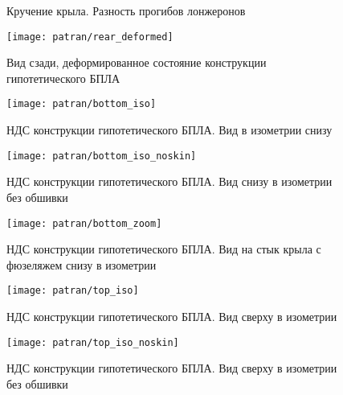 \begin{figure}[H]
\centering
\def\svgwidth{0.9\textwidth}

\caption{Кручение крыла. Разность прогибов лонжеронов}
\label{fig:WingRotating}
\end{figure}


\begin{figure}[H]
\centering
\texttt{[image: patran/rear\_deformed]}
\caption{Вид сзади, деформированное состояние конструкции гипотетического БПЛА}
\label{fig:patranRearDeformed}
\end{figure}


%
%


\begin{figure}[H]
\centering
\texttt{[image: patran/bottom\_iso]}
\caption{НДС конструкции гипотетического БПЛА. Вид в изометрии снизу}
\label{fig:patranBottomIso}
\end{figure}

\begin{figure}[H]
\centering
\texttt{[image: patran/bottom\_iso\_noskin]}
\caption{НДС конструкции гипотетического БПЛА. Вид снизу в изометрии без обшивки}
\label{fig:patranBottomIsoWithoutSkin}
\end{figure}

\begin{figure}[H]
\centering
\texttt{[image: patran/bottom\_zoom]}
\caption{НДС конструкции гипотетического БПЛА. Вид на стык крыла с фюзеляжем снизу в изометрии}
\label{fig:patranBottomIsoZoom}
\end{figure}


\begin{figure}[H]
\centering
\texttt{[image: patran/top\_iso]}
\caption{НДС конструкции гипотетического БПЛА. Вид сверху в изометрии}
\label{fig:patranTopIso}
\end{figure}

\begin{figure}[H]
\centering
\texttt{[image: patran/top\_iso\_noskin]}
\caption{НДС конструкции гипотетического БПЛА. Вид сверху в изометрии без обшивки}
\label{fig:patranTopIsoWithoutSk}
\end{figure}

%
